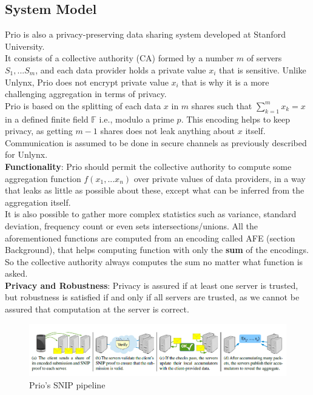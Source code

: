 \documentclass{article}
\begin{document}
\subsection{System Model}
Prio \cite{prio}  is also a privacy-preserving data sharing system developed at Stanford University.\\
It consists of a collective authority (CA) formed by a number $m$ of servers $S_1,...S_m$, and each data provider holds a private value $x_i$ that is sensitive. 
Unlike Unlynx, Prio does not encrypt private value $x_i$ that is why it is a more challenging aggregation in terms of privacy.\\
Prio is based on the splitting of each data $x$ in $m$ shares such that $\sum^m_{k=1}{x_k} = x $ in a defined finite field $\mathbb{F}$ i.e., modulo a prime $p$. This encoding helps to keep privacy, as getting $m-1$ shares does not leak anything about $x$ itself.\\
Communication is assumed to be done in secure channels as previously described for Unlynx.\\
\textbf{Functionality}: Prio should permit the collective authority to compute some aggregation function $f(x_1,...x_n)$ over private values of data providers, in a way that leaks as little as possible about these, except what can be inferred from the aggregation itself.\\
It is also possible to gather more complex statistics such as variance, standard deviation, frequency count or even sets intersections/unions. All the aforementioned functions are computed from an encoding called AFE (section Background), that helps computing function with only the \textbf{sum} of the encodings. So the collective authority always computes the sum no matter what function is asked.\\
\textbf{Privacy and Robustness}: Privacy is assured if at least one server is trusted, but robustness is satisfied if and only if all servers are trusted, as we cannot be assured that computation at the server is correct.
\begin{figure}[H]
\centering
\includegraphics[scale=0.5]{img/prioPip.png}
\caption{Prio's SNIP pipeline}
\end{figure}
\end{document}

